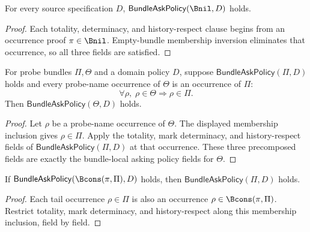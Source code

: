 \begin{theorem}
\label{thm:empty-bundle-local-asking-policy}
For every source specification $D$, $\mathsf{BundleAskPolicy}(\Bnil,D)$ holds.
\end{theorem}
\begin{proof}
Each totality, determinacy, and history-respect clause begins from an
occurrence proof $\pi\in\Bnil$. Empty-bundle membership inversion eliminates
that occurrence, so all three fields are satisfied.
\end{proof}

\begin{theorem}
\label{thm:bundle-local-policy-restriction-by-membership-inclusion}
For probe bundles $\Pi,\Theta$ and a domain policy $D$, suppose $\mathsf{BundleAskPolicy}(\Pi,D)$ holds and every probe-name occurrence of $\Theta$ is an occurrence of $\Pi$:
$$
\forall \rho,\; \rho\in\Theta\Rightarrow \rho\in\Pi.
$$
Then $\mathsf{BundleAskPolicy}(\Theta,D)$ holds.
\end{theorem}
\begin{proof}
Let $\rho$ be a probe-name occurrence of $\Theta$. The displayed membership inclusion gives $\rho\in\Pi$. Apply the totality, mark determinacy, and history-respect fields of $\mathsf{BundleAskPolicy}(\Pi,D)$ at that occurrence. These three precomposed fields are exactly the bundle-local asking policy fields for $\Theta$.
\end{proof}

\begin{lemma}
\label{lem:bundle-local-asking-policy-tail-restriction}
If $\mathsf{BundleAskPolicy}(\Bcons(\pi,\Pi),D)$ holds, then $\mathsf{BundleAskPolicy}(\Pi,D)$ holds.
\end{lemma}
\begin{proof}
Each tail occurrence $\rho\in\Pi$ is also an occurrence $\rho\in\Bcons(\pi,\Pi)$. Restrict totality, mark determinacy, and history-respect along this membership inclusion, field by field.
\end{proof}

